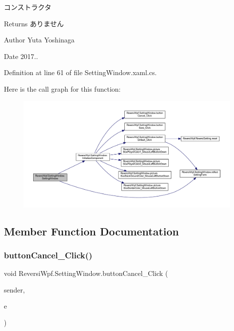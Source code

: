 コンストラクタ 

\begin{DoxyReturn}{Returns}
ありません 
\end{DoxyReturn}
\begin{DoxyAuthor}{Author}
Yuta Yoshinaga 
\end{DoxyAuthor}
\begin{DoxyDate}{Date}
2017.. 
\end{DoxyDate}


Definition at line 61 of file Setting\+Window.\+xaml.\+cs.

Here is the call graph for this function\+:
\nopagebreak
\begin{figure}[H]
\begin{center}
\leavevmode
\includegraphics[width=350pt]{class_reversi_wpf_1_1_setting_window_a6ea5c654540c8cded2c7bef2187d446e_cgraph}
\end{center}
\end{figure}


\subsection{Member Function Documentation}
\mbox{\label{class_reversi_wpf_1_1_setting_window_aacca71ce9e594912ca597fe41f5e6466}} 
\subsubsection{\texorpdfstring{button\+Cancel\+\_\+\+Click()}{buttonCancel\_Click()}}
{\footnotesize\ttfamily void Reversi\+Wpf.\+Setting\+Window.\+button\+Cancel\+\_\+\+Click (\begin{DoxyParamCaption}\item[{object}]{sender,  }\item[{Routed\+Event\+Args}]{e }\end{DoxyParamCaption})\hspace{0.3cm}{\ttfamily [private]}}



